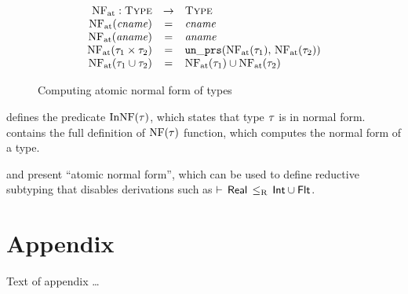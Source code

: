 \begin{figure}
	\[
	\begin{array}{rcl}
	\mathop{\mathrm{NF}_{\mathrm{at}}}: \textsc{Type} &\rightarrow& \textsc{Type} \\
	\mathop{\mathrm{NF}_{\mathrm{at}}}(\mathit{cname}) &=& \mathit{cname} \\
	\mathop{\mathrm{NF}_{\mathrm{at}}}(\mathit{aname}) &=& \mathit{aname} \\
	\mathop{\mathrm{NF}_{\mathrm{at}}}(\tau_1 \times \tau_2) &=& \mathop{\mathtt{un\_prs}}(\mathop{\mathrm{NF}_{\mathrm{at}}}(\tau_1), \, \mathop{\mathrm{NF}_{\mathrm{at}}}(\tau_2))	\\
	\mathop{\mathrm{NF}_{\mathrm{at}}}(\tau_1 \cup \tau_2) &=& \mathop{\mathrm{NF}_{\mathrm{at}}}(\tau_1) \cup \mathop{\mathrm{NF}_{\mathrm{at}}}(\tau_2) \\
	\end{array}
	\]
	\caption{Computing atomic normal form of \BetaJulia types}
	\label{fig:bjnom-calc-nf-full}
\end{figure}

 defines the predicate $\mathop{\mathrm{InNF}}(\tau)$, which states
that type $\tau$ is in normal form.
 contains the full definition of $\mathop{\mathrm{NF}}(\tau)$ 
function, which computes the normal form of a type.

 and  present 
``atomic normal form'', which can be used to define reductive subtyping
that disables derivations such as $\vdash \, \mathsf{Real} \, \leq_\mathrm{R} \, \mathsf{Int} \cup \mathsf{Flt}$.

\section{Appendix}
Text of appendix \ldots
